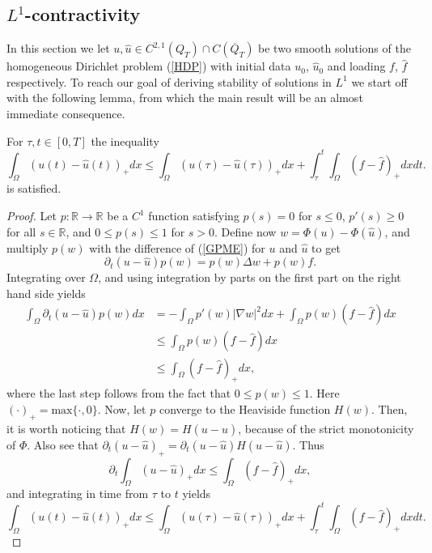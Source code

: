 \documentclass[11pt, a4paper]{article}
\begin{document}
\subsection{$L^1$-contractivity}
In this section we let $u,\hat{u} \in C^{2,1}(Q_T)\cap C(\overline{Q}_T)$ be two smooth solutions of the homogeneous Dirichlet problem (\ref{HDP}) with initial data $u_0$, $\hat{u}_0$ and loading $f$, $\hat{f}$ respectively. To reach our goal of deriving stability of solutions in $L^1$ we start off with the following lemma, from which the main result will be an almost immediate consequence.

\begin{lemma}
\label{lem:l1_stability_classical}
For $\tau, t \in [0,T]$ the inequality 
\begin{equation}
\label{l1_contr_part1}
\int_{\Omega}(u(t)-\hat{u}(t))_+dx \leq \int_{\Omega}(u(\tau)-\hat{u}(\tau))_+dx + \int_\tau^t\int_{\Omega}(f-\hat{f})_+dxdt.
\end{equation}
is satisfied.
\end{lemma}

\begin{proof}
Let $p: \mathbb{R} \to \mathbb{R}$ be a $C^1$ function satisfying $p(s) = 0$ for $s \leq 0$, $p'(s) \geq 0$ for all $s\in \mathbb{R}$, and $0 \leq p(s) \leq 1$ for $s > 0$. Define now $w = \Phi(u) - \Phi(\hat{u})$, and multiply $p(w)$ with the difference of (\ref{GPME}) for $u$ and $\hat{u}$ to get
\begin{equation*}
\partial_t(u-\hat{u})p(w) = p(w)\Delta w + p(w)f.
\end{equation*}
Integrating over $\Omega$, and using integration by parts on the first part on the right hand side yields
\begin{align*}
\int_{\Omega}\partial_t(u-\hat{u})p(w)dx &= -\int_{\Omega}p'(w)|\nabla w|^2dx + \int_{\Omega}p(w)(f-\hat{f}) dx \\
	&\leq \int_{\Omega}p(w)(f-\hat{f}) dx \\
	&\leq \int_{\Omega}(f-\hat{f})_+ dx,
\end{align*}
where the last step follows from the fact that $0 \leq p(w) \leq 1$. Here $(\cdot)_+ = \mathrm{max}\{\cdot, 0\}$.
Now, let $p$ converge to the Heaviside function $H(w)$. Then, it is worth noticing that $H(w) = H(u-\hat{u})$, because of the strict monotonicity of $\Phi$. Also see that $\partial_t(u-\hat{u})_+ = \partial_t(u-\hat{u})H(u-\hat{u})$. Thus
\begin{equation*}
\partial_t \int_{\Omega}(u-\hat{u})_+dx \leq \int_{\Omega}(f-\hat{f})_+ dx,
\end{equation*}
and integrating in time from $\tau$ to $t$ yields
\begin{equation*}
\int_{\Omega}(u(t)-\hat{u}(t))_+dx \leq \int_{\Omega}(u(\tau)-\hat{u}(\tau))_+dx + \int_\tau^t\int_{\Omega}(f-\hat{f})_+dxdt.
\end{equation*}
\end{proof}
\end{document}
